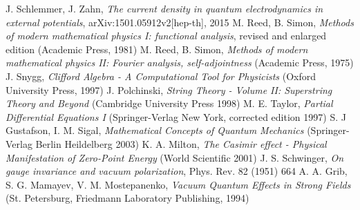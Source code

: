 \documentclass[11pt, oneside]{report}   	%
\title{}
\author{}
\begin{document}

%



\begin{thebibliography}{9}
 J. Schlemmer, J. Zahn, \textit{The current density in quantum electrodynamics in external potentials}, arXiv:1501.05912v2[hep-th], 2015
 M. Reed, B. Simon, \textit{Methods of modern mathematical physics I: functional analysis}, revised and enlarged edition (Academic Press, 1981)
 M. Reed, B. Simon, \textit{Methods of modern mathematical physics II: Fourier analysis, self-adjointness} (Academic Press, 1975)
 J. Snygg, \textit{Clifford Algebra - A Computational Tool for Physicists} (Oxford University Press, 1997)
 J. Polchinski, \textit{String Theory - Volume II: Superstring Theory and Beyond} (Cambridge University Press 1998)
 M. E. Taylor, \textit{Partial Differential Equations I} (Springer-Verlag New York, corrected edition 1997)
 S. J Gustafson, I. M. Sigal, \textit{Mathematical Concepts of Quantum Mechanics} (Springer-Verlag Berlin Heildelberg 2003)
 K. A. Milton, \textit{The Casimir effect - Physical Manifestation of Zero-Point Energy} (World Scientific 2001)
 J. S. Schwinger, \textit{On gauge invariance and vacuum polarization}, Phys. Rev. 82 (1951) 664
 A. A. Grib, S. G. Mamayev, V. M. Mostepanenko, \textit{Vacuum Quantum Effects in Strong Fields} (St. Petersburg, Friedmann Laboratory Publishing, 1994)\end{thebibliography}
\end{document}
